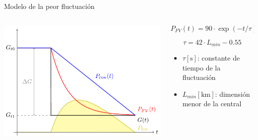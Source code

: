\documentclass[aspectratio=169, usenames,svgnames,dvipsnames]{beamer}
\begin{document}
\begin{frame}[label={sec:orgd8a4555}]{Modelo de la peor fluctuación}
\begin{columns}
\begin{column}{0.4\columnwidth}
\begin{center}
\includegraphics[width=\textwidth]{../figs/ModeloPeorFluctuacion.pdf}
\end{center}
\end{column}

\begin{column}{0.6\columnwidth}
\[
  P_{FV}(t) = 90 \cdot \exp(-t/\tau) + 10
\]

\[
  \tau = 42 \cdot L_{min} - 0.55
\]

\begin{itemize}
\item \(\tau [\unit{\second}]\): constante de tiempo de la fluctuación
\item \(L_{min} [\unit{\kilo\meter}]\): dimensión menor de la central
\end{itemize}
\end{column}
\end{columns}
\end{frame}
\end{document}
